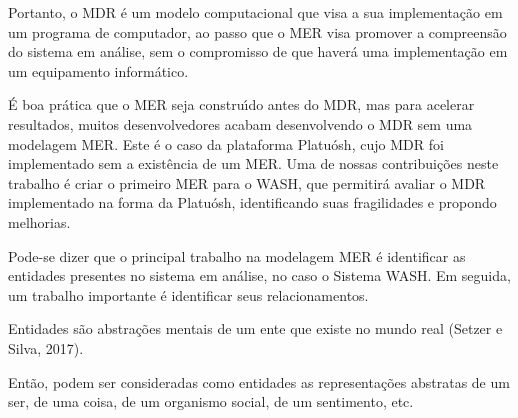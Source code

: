 \documentclass[
12pt,		%
openright,	%
twoside,  %
a4paper,			%
chapter=TITLE,		%
english,			%
french,				%
spanish,			%
brazil				%
]{USPSC-classe/USPSC}
\begin{document}
Portanto, o MDR \'e um modelo computacional que visa a sua implementa\c{c}\~ao em um programa de computador, ao passo que o MER visa promover a compreens\~ao do sistema em an\'alise, sem o compromisso de que haver\'a uma implementa\c{c}\~ao em um equipamento inform\'atico.














\'E boa pr\'atica que o MER seja constru\'{\i}do antes do MDR, mas para acelerar resultados, muitos desenvolvedores acabam desenvolvendo o MDR sem uma modelagem MER. Este \'e o caso da plataforma Platu\'osh, cujo MDR foi implementado sem a exist\^encia de um MER. Uma de nossas contribui\c{c}\~oes neste trabalho \'e criar o primeiro MER para o WASH, que permitir\'a avaliar o MDR implementado na forma da Platu\'osh, identificando suas fragilidades e propondo melhorias.














Pode-se dizer que o principal trabalho na modelagem MER \'e identificar as entidades presentes no sistema em an\'alise, no caso o Sistema WASH. Em seguida, um trabalho importante \'e identificar seus relacionamentos.














Entidades s\~ao abstra\c{c}\~oes mentais de um ente que existe no mundo real  (Setzer e Silva, 2017).














Ent\~ao, podem ser consideradas como entidades as representa\c{c}\~oes abstratas de um ser, de uma coisa, de um organismo social, de um sentimento, etc.
\end{document}
